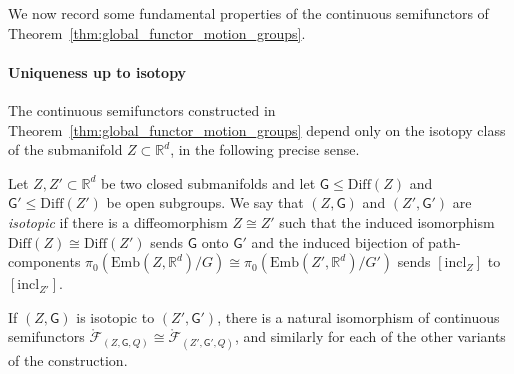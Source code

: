 \documentclass[AHL,Unicode,published]{cedram}
\newcommand{\Emb}{\mathrm{Emb}}
\newcommand{\Diff}{\mathrm{Diff}}
\newcommand{\rincl}{\mathrm{incl}}
\newcommand{\Int}{\mathring}
\newcommand{\sG}{\mathsf{G}}
\newcommand{\cF}{\mathcal{F}}
\newcommand{\bR}{\mathbb{R}}
\renewcommand{\leq}{\leqslant}
\begin{document}
We now record some fundamental properties of the continuous semifunctors of Theorem~\ref{thm:global_functor_motion_groups}.


\paragraph*{Uniqueness up to isotopy}
The continuous semifunctors constructed in Theorem~\ref{thm:global_functor_motion_groups} depend only on the isotopy class of the submanifold $Z \subset \bR^d$, in the following precise sense.

\begin{defi}\label{def:isotopic}
Let $Z,Z' \subset \bR^d$ be two closed submanifolds and let $\sG \leq \Diff(Z)$ and $\sG' \leq \Diff(Z')$ be open subgroups. We say that $(Z,\sG)$ and $(Z',\sG')$ are \emph{isotopic} if there is a diffeomorphism $Z \cong Z'$ such that the induced isomorphism $\Diff(Z) \cong \Diff(Z')$ sends $\sG$ onto $\sG'$ and the induced bijection of path-components $\pi_{0}(\Emb(Z,\bR^d)/G) \cong \pi_{0}(\Emb(Z',\bR^d)/G')$ sends $[\rincl_Z]$ to $[\rincl_{Z'}]$.
\end{defi}

\begin{prop}\label{prop:isotopic}
If $(Z,\sG)$ is isotopic to $(Z',\sG')$, there is a natural isomorphism of continuous semifunctors $\Int{\cF}_{(Z,\sG,Q)} \cong \Int{\cF}_{(Z',\sG',Q)}$, and similarly for each of the other variants of the construction.
\end{prop}
\end{document}
